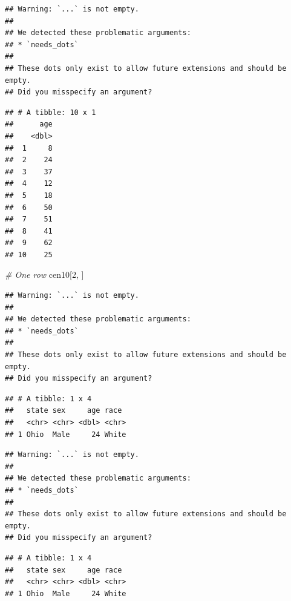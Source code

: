 \documentclass[
]{book}
\newenvironment{Shaded}{\begin{snugshade}}{\end{snugshade}}
\newcommand{\CommentTok}[1]{\textcolor[rgb]{0.56,0.35,0.01}{\textit{#1}}}
\newcommand{\DecValTok}[1]{\textcolor[rgb]{0.00,0.00,0.81}{#1}}
\newcommand{\KeywordTok}[1]{\textcolor[rgb]{0.13,0.29,0.53}{\textbf{#1}}}
\newcommand{\NormalTok}[1]{#1}
\newcommand{\OperatorTok}[1]{\textcolor[rgb]{0.81,0.36,0.00}{\textbf{#1}}}
\newcommand{\StringTok}[1]{\textcolor[rgb]{0.31,0.60,0.02}{#1}}
\theoremstyle{definition}
\theoremstyle{definition}
\theoremstyle{definition}
\theoremstyle{definition}
\theoremstyle{remark}
\begin{document}
\begin{verbatim}
## Warning: `...` is not empty.
## 
## We detected these problematic arguments:
## * `needs_dots`
## 
## These dots only exist to allow future extensions and should be empty.
## Did you misspecify an argument?
\end{verbatim}

\begin{verbatim}
## # A tibble: 10 x 1
##      age
##    <dbl>
##  1     8
##  2    24
##  3    37
##  4    12
##  5    18
##  6    50
##  7    51
##  8    41
##  9    62
## 10    25
\end{verbatim}

\begin{Shaded}
\begin{Highlighting}[]
\CommentTok{# One row}
\NormalTok{cen10[}\DecValTok{2}\NormalTok{, ]}
\end{Highlighting}
\end{Shaded}

\begin{verbatim}
## Warning: `...` is not empty.
## 
## We detected these problematic arguments:
## * `needs_dots`
## 
## These dots only exist to allow future extensions and should be empty.
## Did you misspecify an argument?
\end{verbatim}

\begin{verbatim}
## # A tibble: 1 x 4
##   state sex     age race 
##   <chr> <chr> <dbl> <chr>
## 1 Ohio  Male     24 White
\end{verbatim}

\begin{Shaded}
\end{Shaded}

\begin{verbatim}
## Warning: `...` is not empty.
## 
## We detected these problematic arguments:
## * `needs_dots`
## 
## These dots only exist to allow future extensions and should be empty.
## Did you misspecify an argument?
\end{verbatim}

\begin{verbatim}
## # A tibble: 1 x 4
##   state sex     age race 
##   <chr> <chr> <dbl> <chr>
## 1 Ohio  Male     24 White
\end{verbatim}
\end{document}
